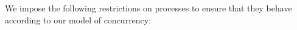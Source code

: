 We impose the following restrictions on processes to ensure that they behave according to our model of concurrency:
